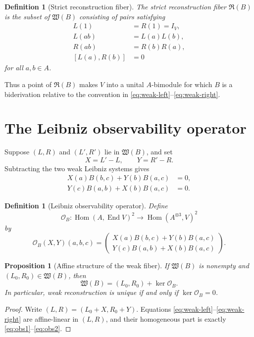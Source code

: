 \documentclass[11pt]{amsart}
\newtheorem{proposition}[theorem]{Proposition}
\newtheorem{definition}[theorem]{Definition}
\newcommand{\End}{\operatorname{End}}
\newcommand{\Hom}{\operatorname{Hom}}
\newcommand{\Wfib}{\mathfrak W}
\newcommand{\Rfib}{\mathfrak R}
\newcommand{\cO}{\mathcal O}
\begin{document}
\begin{definition}[Strict reconstruction fiber]
The strict reconstruction fiber $\Rfib(B)$ is the subset of $\Wfib(B)$ consisting of pairs satisfying
\begin{align}
L(1)&=R(1)=I_V, \label{eq:unit}\\
L(ab)&=L(a)L(b), \label{eq:left-rep}\\
R(ab)&=R(b)R(a), \label{eq:right-rep}\\
[L(a),R(b)]&=0 \label{eq:commuting-actions}
\end{align}
for all $a,b\in A$.
\end{definition}

Thus a point of $\Rfib(B)$ makes $V$ into a unital $A$-bimodule for which $B$ is a biderivation relative to the convention in \eqref{eq:weak-left}--\eqref{eq:weak-right}.

\section{The Leibniz observability operator}

Suppose $(L,R)$ and $(L',R')$ lie in $\Wfib(B)$, and set
\[
X=L'-L,
\qquad
Y=R'-R.
\]
Subtracting the two weak Leibniz systems gives
\begin{align}
X(a)B(b,c)+Y(b)B(a,c)&=0, \label{eq:obs1}\\
Y(c)B(a,b)+X(b)B(a,c)&=0. \label{eq:obs2}
\end{align}

\begin{definition}[Leibniz observability operator]
Define
\[
\cO_B:\Hom(A,\End V)^2\longrightarrow \Hom(A^{\otimes3},V)^2
\]
by
\[
\cO_B(X,Y)(a,b,c)=
\begin{pmatrix}
X(a)B(b,c)+Y(b)B(a,c)\\
Y(c)B(a,b)+X(b)B(a,c)
\end{pmatrix}.
\]
\end{definition}

\begin{proposition}[Affine structure of the weak fiber]\label{prop:weak-affine}
If $\Wfib(B)$ is nonempty and $(L_0,R_0)\in\Wfib(B)$, then
\[
\Wfib(B)=(L_0,R_0)+\ker\cO_B.
\]
In particular, weak reconstruction is unique if and only if $\ker\cO_B=0$.
\end{proposition}

\begin{proof}
Write $(L,R)=(L_0+X,R_0+Y)$.  Equations \eqref{eq:weak-left}--\eqref{eq:weak-right} are affine-linear in $(L,R)$, and their homogeneous part is exactly \eqref{eq:obs1}--\eqref{eq:obs2}.
\end{proof}
\end{document}
